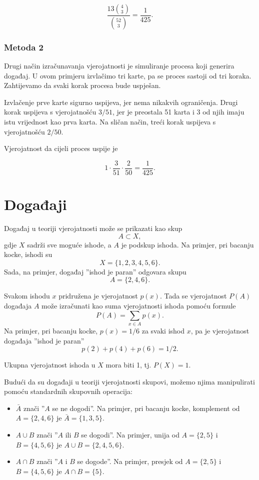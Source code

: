 \[\frac{13 {4 \choose 3}}{{52 \choose 3}} = \frac{1}{425}.\]

\subsubsection*{Metoda 2}

Drugi način izračunavanja vjerojatnosti je
simuliranje procesa koji generira događaj.
U ovom primjeru izvlačimo tri karte, pa se proces
sastoji od tri koraka.
Zahtijevamo da svaki korak procesa bude uspješan.

Izvlačenje prve karte sigurno uspijeva,
jer nema nikakvih ograničenja.
Drugi korak uspijeva s vjerojatnošću $3/51$,
jer je preostala 51 karta i 3 od njih
imaju istu vrijednost kao prva karta.
Na sličan način, treći korak uspijeva s vjerojatnošću $2/50$.

Vjerojatnost da cijeli proces uspije je

\[1 \cdot \frac{3}{51} \cdot \frac{2}{50} = \frac{1}{425}.\]

\section{Događaji}

Događaj u teoriji vjerojatnosti može se prikazati kao skup
\[A \subset X,\]
gdje $X$ sadrži sve moguće ishode,
a $A$ je podskup ishoda.
Na primjer, pri bacanju kocke, ishodi su
\[X = \{1,2,3,4,5,6\}.\]
Sada, na primjer, događaj ''ishod je paran''
odgovara skupu
\[A = \{2,4,6\}.\]

Svakom ishodu $x$ pridružena je vjerojatnost $p(x)$.
Tada se vjerojatnost $P(A)$ događaja
$A$ može izračunati kao suma
vjerojatnosti ishoda pomoću formule
\[P(A) = \sum_{x \in A} p(x).\]
Na primjer, pri bacanju kocke,
$p(x)=1/6$ za svaki ishod $x$,
pa je vjerojatnost događaja
''ishod je paran''
\[p(2)+p(4)+p(6)=1/2.\]

Ukupna vjerojatnost ishoda u $X$ mora
biti 1, tj. $P(X)=1$.

Budući da su događaji u teoriji vjerojatnosti skupovi,
možemo njima manipulirati pomoću standardnih skupovnih operacija:

\begin{itemize}
\item {} $\bar A$ znači
''$A$ se ne dogodi''.
Na primjer, pri bacanju kocke,
komplement od $A=\{2,4,6\}$ je
$\bar A = \{1,3,5\}$.
\item {} $A \cup B$ znači
''$A$ ili $B$ se dogodi''.
Na primjer, unija od
$A=\{2,5\}$
i $B=\{4,5,6\}$ je
$A \cup B = \{2,4,5,6\}$.
\item {} $A \cap B$ znači
''$A$ i $B$ se dogode''.
Na primjer, presjek od
$A=\{2,5\}$ i $B=\{4,5,6\}$ je
$A \cap B = \{5\}$.
\end{itemize}

